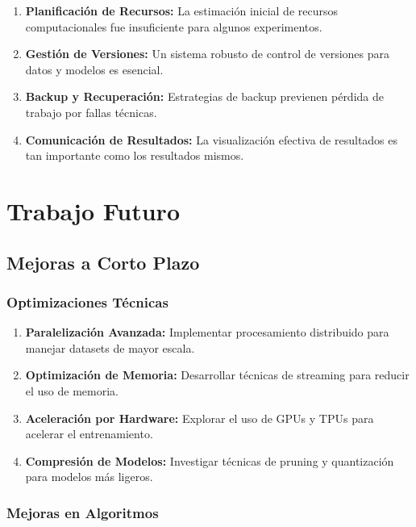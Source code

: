 \begin{enumerate}
    \item \textbf{Planificación de Recursos:} La estimación inicial de recursos computacionales fue insuficiente para algunos experimentos.
    
    \item \textbf{Gestión de Versiones:} Un sistema robusto de control de versiones para datos y modelos es esencial.
    
    \item \textbf{Backup y Recuperación:} Estrategias de backup previenen pérdida de trabajo por fallas técnicas.
    
    \item \textbf{Comunicación de Resultados:} La visualización efectiva de resultados es tan importante como los resultados mismos.
\end{enumerate}

\section{Trabajo Futuro}

\subsection{Mejoras a Corto Plazo}

\subsubsection{Optimizaciones Técnicas}

\begin{enumerate}
    \item \textbf{Paralelización Avanzada:} Implementar procesamiento distribuido para manejar datasets de mayor escala.
    
    \item \textbf{Optimización de Memoria:} Desarrollar técnicas de streaming para reducir el uso de memoria.
    
    \item \textbf{Aceleración por Hardware:} Explorar el uso de GPUs y TPUs para acelerar el entrenamiento.
    
    \item \textbf{Compresión de Modelos:} Investigar técnicas de pruning y quantización para modelos más ligeros.
\end{enumerate}

\subsubsection{Mejoras en Algoritmos}

